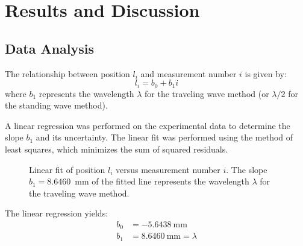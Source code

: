 \documentclass[12pt]{article}
\begin{document}
\section{Results and Discussion}

\subsection{Data Analysis}

The relationship between position $l_i$ and measurement number $i$ is given by:
\begin{equation}
l_i = b_0 + b_1 i
\end{equation}
where $b_1$ represents the wavelength $\lambda$ for the traveling wave method (or $\lambda/2$ for the standing wave method).

A linear regression was performed on the experimental data to determine the slope $b_1$ and its uncertainty. The linear fit was performed using the method of least squares, which minimizes the sum of squared residuals.

\begin{figure}[ht]
\centering
{}
\caption{Linear fit of position $l_i$ versus measurement number $i$. The slope $b_1 = 8.6460$~\si{\milli\meter} of the fitted line represents the wavelength $\lambda$ for the traveling wave method.}
\label{fig:linear_fit}
\end{figure}

The linear regression yields:
\begin{align}
b_0 &= -5.6438~\si{\milli\meter} \\
b_1 &= 8.6460~\si{\milli\meter} = \lambda
\end{align}
\end{document}
